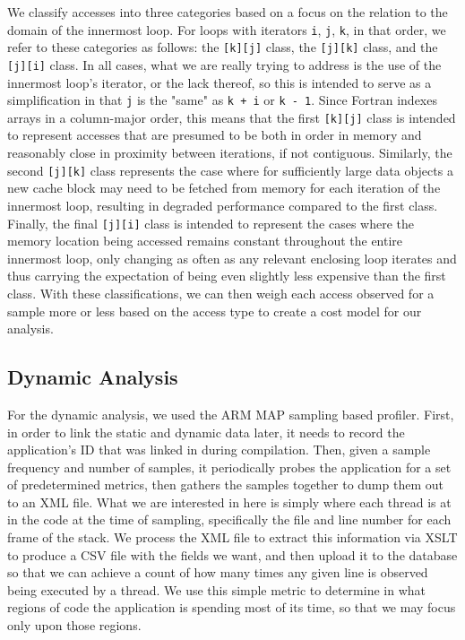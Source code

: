 We classify accesses into three categories based on a focus on the relation to the domain of the innermost loop.
For loops with iterators \texttt{i}, \texttt{j}, \texttt{k}, in that order, we refer to these categories as follows: the \texttt{[k][j]} class, the \texttt{[j][k]} class, and the \texttt{[j][i]} class.
In all cases, what we are really trying to address is the use of the innermost loop's iterator, or the lack thereof, so this is intended to serve as a simplification in that \texttt{j} is the "same" as \texttt{k + i} or \texttt{k - 1}.
Since Fortran indexes arrays in a column-major order, this means that the first \texttt{[k][j]} class is intended to represent accesses that are presumed to be both in order in memory and reasonably close in proximity between iterations, if not contiguous.
Similarly, the second \texttt{[j][k]} class represents the case where for sufficiently large data objects a new cache block may need to be fetched from memory for each iteration of the innermost loop, resulting in degraded performance compared to the first class.
Finally, the final \texttt{[j][i]} class is intended to represent the cases where the memory location being accessed remains constant throughout the entire innermost loop, only changing as often as any relevant enclosing loop iterates and thus carrying the expectation of being even slightly less expensive than the first class.
With these classifications, we can then weigh each access observed for a sample more or less based on the access type to create a cost model for our analysis.%
\subsection{Dynamic Analysis}
For the dynamic analysis, we used the ARM MAP sampling based profiler.
First, in order to link the static and dynamic data later, it needs to record the application's ID that was linked in during compilation.
Then, given a sample frequency and number of samples, it periodically probes the application for a set of predetermined metrics, then gathers the samples together to dump them out to an \acs{XML} file.
What we are interested in here is simply where each thread is at in the code at the time of sampling, specifically the file and line number for each frame of the stack.
We process the \acs{XML} file to extract this information via \ac{XSLT} to produce a \acs{CSV} file with the fields we want, and then upload it to the database so that we can achieve a count of how many times any given line is observed being executed by a thread.
We use this simple metric to determine in what regions of code the application is spending most of its time, so that we may focus only upon those regions.

